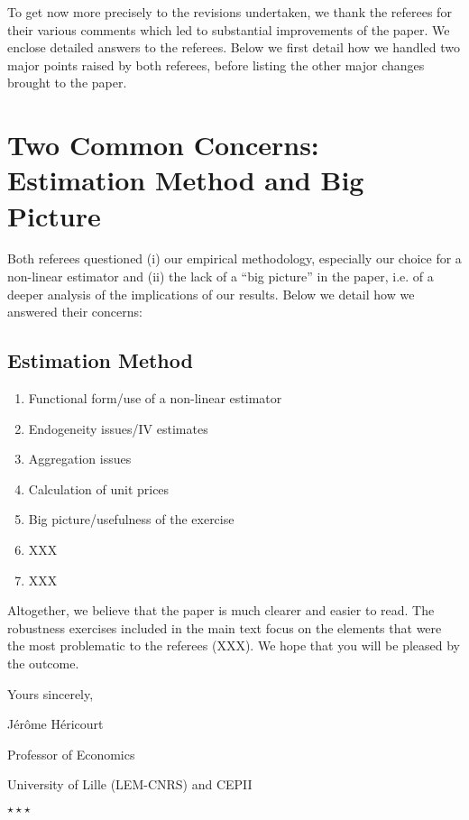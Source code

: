\documentclass[12pt]{article}
\newcommand*\sepstars{%
  \begin{center}
    $\star\star\star$
  \end{center}}
\begin{document}
To get now more precisely to the revisions undertaken, we thank the referees for their various comments which led to substantial improvements of the paper. We enclose detailed answers to the referees. Below we first detail how we handled two major points raised by both referees, before listing the other major changes brought to the paper.

\section{Two Common Concerns: Estimation Method and Big Picture}
Both referees questioned (i) our empirical methodology, especially our choice for a non-linear estimator and (ii) the lack of a ``big picture'' in the paper, i.e. of a deeper analysis of the implications of our results. Below we detail how we answered their concerns:\medskip

\subsection{Estimation Method}



\begin{enumerate}


\item Functional form/use of a non-linear estimator
\item Endogeneity issues/IV estimates
\item Aggregation issues
\item Calculation of unit prices
\item Big picture/usefulness of the exercise
\item XXX
\item XXX


\end{enumerate}

Altogether, we believe that the paper is much clearer and easier to read. The robustness exercises included in the main text focus on the elements that were the most problematic to the referees (XXX). We hope that you will be pleased by the outcome.

\bigskip

Yours sincerely,

\bigskip

\hfill Jérôme Héricourt

\hfill Professor of Economics

\hfill University of Lille (LEM-CNRS) and CEPII

\bigskip
\bigskip
\bigskip
\sepstars
\end{document}
